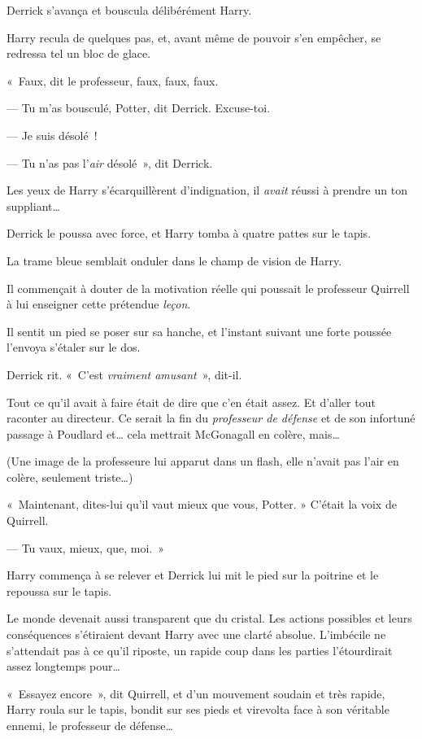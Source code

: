 Derrick s'avança et bouscula délibérément Harry.

Harry recula de quelques pas, et, avant même de pouvoir s'en empêcher, se redressa tel un bloc de glace.

«~Faux, dit le professeur, faux, faux, faux.

--- Tu m'as bousculé, Potter, dit Derrick. Excuse-toi.

--- Je suis désolé~!

--- Tu n'as pas l'\emph{air} désolé~», dit Derrick.

Les yeux de Harry s'écarquillèrent d'indignation, il \emph{avait} réussi à prendre un ton suppliant…

Derrick le poussa avec force, et Harry tomba à quatre pattes sur le tapis.

La trame bleue semblait onduler dans le champ de vision de Harry.

Il commençait à douter de la motivation réelle qui poussait le professeur Quirrell à lui enseigner cette prétendue \emph{leçon}.

Il sentit un pied se poser sur sa hanche, et l'instant suivant une forte poussée l'envoya s'étaler sur le dos.

Derrick rit.
«~C'est \emph{vraiment amusant}~», dit-il.

Tout ce qu'il avait à faire était de dire que c'en était assez.
Et d'aller tout raconter au directeur.
Ce serait la fin du \emph{professeur de défense} et de son infortuné passage à Poudlard et… cela mettrait McGonagall en colère, mais…

(Une image de la professeure lui apparut dans un flash, elle n'avait pas l'air en colère, seulement triste…)

«~Maintenant, dites-lui qu'il vaut mieux que vous, Potter. » C'était la voix de Quirrell.

--- Tu vaux, mieux, que, moi.~»

Harry commença à se relever et Derrick lui mit le pied sur la poitrine et le repoussa sur le tapis.

Le monde devenait aussi transparent que du cristal.
Les actions possibles et leurs conséquences s'étiraient devant Harry avec une clarté absolue.
L'imbécile ne s'attendait pas à ce qu'il riposte, un rapide coup dans les parties l'étourdirait assez longtemps pour…

«~Essayez encore~», dit Quirrell, et d'un mouvement soudain et très rapide, Harry roula sur le tapis, bondit sur ses pieds et virevolta face à son véritable ennemi, le professeur de défense…

